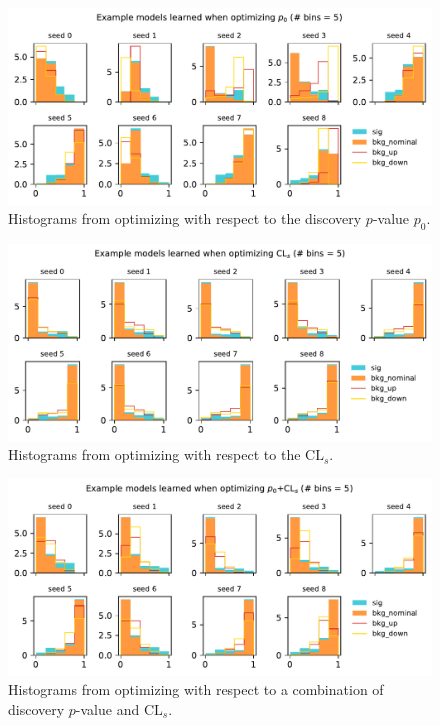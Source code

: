 \documentclass[
  11pt,
  numbers=noendperiod]{book}
\begin{document}
\begin{figure}

{\centering \includegraphics{./images/new-hist-models-discovery-5bin.pdf}

}

\caption{\label{fig-hists-5bin-discovery}Histograms from optimizing with
respect to the discovery \(p\)-value \(p_0\).}

\end{figure}

\begin{figure}

{\centering \includegraphics{./images/new-hist-models-CLs-5nobin.pdf}

}

\caption{\label{fig-hists-5nobin-CLs}Histograms from optimizing with
respect to the \(\mathrm{CL}_s\).}

\end{figure}

\begin{figure}

{\centering \includegraphics{./images/new-hist-models-COMB-5nobin.pdf}

}

\caption{\label{fig-hists-5bin-comb}Histograms from optimizing with
respect to a combination of discovery \(p\)-value and
\(\mathrm{CL}_s\).}

\end{figure}
\end{document}
